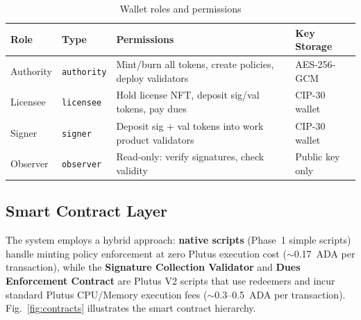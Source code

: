 \documentclass[conference,10pt]{IEEEtran}
\begin{document}
\begin{table}[t]
\centering
\caption{Wallet roles and permissions}
\label{tab:wallets}
\scriptsize
\begin{tabular}{@{}L{1.3cm}L{1.5cm}L{2.5cm}L{1.5cm}@{}}
\toprule
\textbf{Role} & \textbf{Type} & \textbf{Permissions} & \textbf{Key Storage} \\
\midrule
Authority & \texttt{authority} & Mint/burn all tokens, create policies, deploy validators & AES-256-GCM \\
Licensee & \texttt{licensee} & Hold license NFT, deposit sig/val tokens, pay dues & CIP-30 wallet \\
Signer & \texttt{signer} & Deposit sig + val tokens into work product validators & CIP-30 wallet \\
Observer & \texttt{observer} & Read-only: verify signatures, check validity & Public key only \\
\bottomrule
\end{tabular}
\end{table}

\subsection{Smart Contract Layer}

The system employs a hybrid approach: \textbf{native scripts} (Phase~1 simple scripts) handle minting policy enforcement at zero Plutus execution cost (${\sim}$0.17~ADA per transaction), while the \textbf{Signature Collection Validator} and \textbf{Dues Enforcement Contract} are Plutus V2 scripts that use redeemers and incur standard Plutus CPU/Memory execution fees (${\sim}$0.3--0.5~ADA per transaction). Fig.~\ref{fig:contracts} illustrates the smart contract hierarchy.
\end{document}
